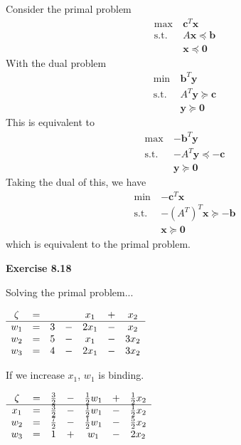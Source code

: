 \documentclass[letterpaper,12pt]{article}
\newcommand{\vect}[1]{\mathbf{#1}}
\begin{document}
Consider the primal problem
\begin{align*}
\max \ & \vect{c}^T \vect{x} \\
\text{s.t.} \ & A \vect{x} \preceq \vect{b} \\
& \vect{x} \preceq \vect{0}
\end{align*}
With the dual problem
\begin{align*}
\min \ & \vect{b}^T \vect{y} \\
\text{s.t.} \ & A^T \vect{y} \succeq \vect{c} \\
& \vect{y} \succeq \vect{0}
\end{align*}
This is equivalent to
\begin{align*}
\max \ & \vect{-b}^T \vect{y} \\
\text{s.t.} \ & -A^T \vect{y} \preceq -\vect{c} \\
& \vect{y} \succeq \vect{0}
\end{align*}
Taking the dual of this, we have
\begin{align*}
\min \ & \vect{-c}^T \vect{x} \\
\text{s.t.} \ & -(A^T)^T \vect{x} \succeq -\vect{b} \\
& \vect{x} \succeq \vect{0}
\end{align*}
which is equivalent to the primal problem.

\textbf{Exercise 8.18}

Solving the primal problem...
\begin{center}
	$\begin{array}{ c c c c c c c c  }
	\zeta & = & & & x_1 & + & x_2 \\
	\hline
	w_1 & = & 3 & - & 2x_1 & - & x_2 \\
	w_2 & = & 5 & - & x_1 & - & 3x_2 \\
	w_3 & = & 4 & - & 2x_1 & - & 3x_2 \\
	\end{array}$ \\
\end{center}

If we increase $x_1$, $w_1$ is binding. \\

\begin{center}
	$\begin{array}{ c c c c c c c c  }
	\zeta & = & \frac{3}{2} & - & \frac{1}{2}w_1 & + & \frac{1}{2}x_2 \\
	\hline
	x_1 & = & \frac{3}{2} & - & \frac{1}{2}w_1 & - & \frac{1}{2}x_2 \\
	w_2 & = & \frac{7}{2} & - & \frac{1}{2}w_1 & - & \frac{5}{2}x_2 \\
	w_3 & = & 1 & + & w_1 & - & 2x_2 \\
	\end{array}$ \\
\end{center}
\end{document}
